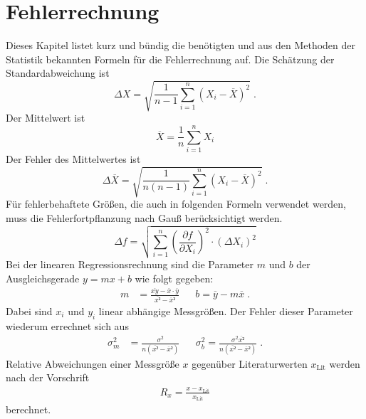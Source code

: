 \section{Fehlerrechnung}
Dieses Kapitel listet kurz und bündig die benötigten und aus den Methoden der Statistik bekannten Formeln für die Fehlerrechnung auf.
Die Schätzung der Standardabweichung ist
\begin{equation}
  \label{eq:std}
  \Delta X = \sqrt{\frac{1}{n-1}\sum_{i=1}^n(X_i-\overline{X})^2}     \; .
\end{equation}
Der Mittelwert ist
\begin{equation}
  \overline{X} = \frac{1}{n} \sum_{i=1}^nX_i
\end{equation}
Der Fehler des Mittelwertes ist
\begin{equation}
  \label{eq:std_mean}
  \Delta \overline{X} = \sqrt{\frac{1}{n(n-1)}\sum_{i=1}^n(X_i-\overline{X})^2}   \; .
\end{equation}
Für fehlerbehaftete Größen, die auch in folgenden Formeln verwendet werden, muss die Fehlerfortpflanzung nach Gauß berücksichtigt werden.
\begin{equation}
  \label{eq:GFFP}
  \Delta f = \sqrt{\sum_{i=1}^n \left(\frac{\partial f}{\partial X_i}\right)^2 \cdot (\Delta X_i)^2}
\end{equation}
Bei der linearen Regressionsrechnung sind die Parameter $m$ und $b$ der Ausgleichsgerade $y=mx+b$ wie folgt gegeben:
\begin{align}
  m &= \frac{\overline{xy}-\overline{x}\cdot\overline{y}}{\overline{x²} - \overline{x}²} & &  b = \overline{y} - m \overline{x}  \; .
\end{align}
Dabei sind $x_i$ und $y_i$ linear abhängige Messgrößen. Der Fehler dieser Parameter wiederum errechnet sich aus
\begin{align}
  \sigma_m^2 &= \frac{\sigma^2}{n(\overline{x²} - \overline{x}²)} & &\sigma_b^2 = \frac{\sigma^2\overline{x²}}{n(\overline{x²} - \overline{x}²)} \; .
\end{align}
Relative Abweichungen einer Messgröße $x$ gegenüber Literaturwerten $x_\text{Lit}$ werden nach der Vorschrift
\begin{align}
  R_x = \frac{x-x_\text{Lit}}{x_\text{Lit}}
\end{align}
berechnet.
